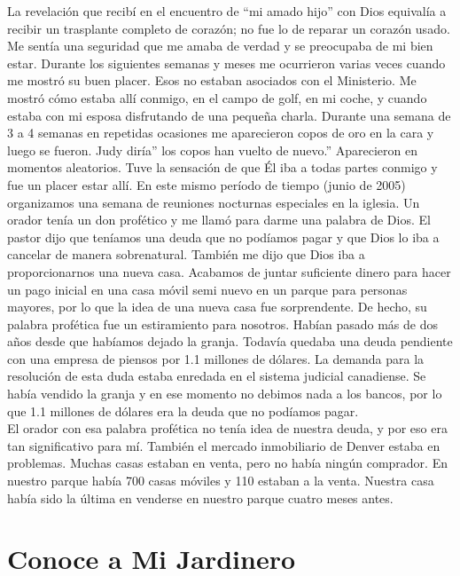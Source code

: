 \documentclass[twoside, 12pt]{book}
\begin{document}
La revelación que recibí en el encuentro de “mi amado hijo” con Dios equivalía a recibir un trasplante completo de corazón; no fue lo de reparar un corazón usado.  Me sentía una seguridad que me amaba de verdad y se preocupaba de mi bien estar. Durante los siguientes semanas y meses me ocurrieron varias veces cuando me mostró su buen placer. Esos no estaban asociados con el Ministerio. Me mostró cómo estaba allí conmigo, en el campo de golf, en mi coche, y cuando estaba con mi esposa disfrutando de una pequeña charla. Durante una semana de 3 a 4 semanas en repetidas ocasiones me aparecieron copos de oro en la cara y luego se fueron.  Judy diría” los copos han vuelto de nuevo.” Aparecieron en momentos aleatorios. Tuve la sensación de que Él iba a todas partes conmigo y fue un placer estar allí. En este mismo período de tiempo (junio de 2005) organizamos una semana de reuniones nocturnas especiales en la iglesia. Un orador tenía un don profético y me llamó para darme una palabra de Dios. El pastor dijo que teníamos una deuda que no podíamos pagar y que Dios lo iba a cancelar de manera sobrenatural. También me dijo que Dios iba a proporcionarnos una nueva casa. Acabamos de juntar suficiente dinero para hacer un pago inicial en una casa móvil semi nuevo en un parque para personas mayores, por lo que la idea de una nueva casa fue sorprendente. De hecho, su palabra profética fue un estiramiento para nosotros. Habían pasado más de dos años desde que habíamos dejado la granja. Todavía quedaba una deuda pendiente con una empresa de piensos por 1.1 millones de dólares. La demanda para la resolución de esta duda estaba enredada en el sistema judicial canadiense. Se había vendido la granja y en ese momento no debimos nada a los bancos, por lo que 1.1 millones de dólares era la deuda que no podíamos pagar.\\

El orador con esa palabra profética no tenía idea de nuestra deuda, y por eso era tan significativo para mí. También el mercado inmobiliario de Denver estaba en problemas. Muchas casas estaban en venta, pero no había ningún comprador. En nuestro parque había 700 casas móviles y 110 estaban a la venta. Nuestra casa había sido la última en venderse en nuestro parque cuatro meses antes.\\

\section{Conoce a Mi Jardinero}
\end{document}
